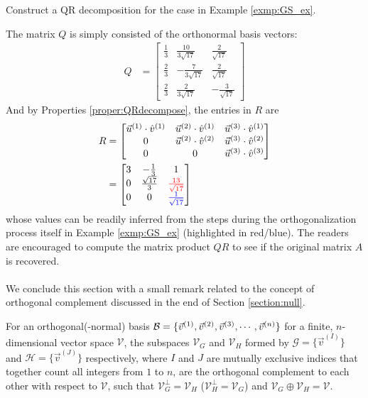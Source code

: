 \begin{exmp}
\label{exmp:QRdecom}
Construct a QR decomposition for the case in Example \ref{exmp:GS_ex}.
\end{exmp}
\begin{solution}
The matrix $Q$ is simply consisted of the orthonormal basis vectors:
\begin{align*}
Q &= 
\begin{bmatrix}
\frac{1}{3} & \frac{10}{3\sqrt{17}} & \frac{2}{\sqrt{17}} \\
\frac{2}{3} & -\frac{7}{3\sqrt{17}} & \frac{2}{\sqrt{17}} \\
\frac{2}{3} & \frac{2}{3\sqrt{17}} & -\frac{3}{\sqrt{17}}
\end{bmatrix}
\end{align*}
And by Properties \ref{proper:QRdecompose}, the entries in $R$ are
\begin{align*}
R &= 
\begin{bmatrix}
\vec{u}^{(1)} \cdot \hat{v}^{(1)} & \vec{u}^{(2)} \cdot \hat{v}^{(1)} & \vec{u}^{(3)} \cdot \hat{v}^{(1)} \\
0 & \vec{u}^{(2)} \cdot \hat{v}^{(2)} & \vec{u}^{(3)} \cdot \hat{v}^{(2)} \\
0 & 0 & \vec{u}^{(3)} \cdot \hat{v}^{(3)}
\end{bmatrix}  \\
&= 
\begin{bmatrix}
3 & -\frac{1}{3} & 1 \\
0 & \frac{\sqrt{17}}{3} & \textcolor{red}{\frac{13}{\sqrt{17}}}  \\
0 & 0 & \textcolor{blue}{\frac{1}{\sqrt{17}}} \\
\end{bmatrix} 
\end{align*}
whose values can be readily inferred from the steps during the orthogonalization process itself in Example \ref{exmp:GS_ex} (highlighted in red/blue). The readers are encouraged to compute the matrix product $QR$ to see if the original matrix $A$ is recovered.\\
\\
We conclude this section with a small remark related to the concept of orthogonal complement discussed in the end of Section \ref{section:null}.
\begin{proper}
\label{proper:orthodirectsum}
For an orthogonal(-normal) basis $\mathcal{B} = \{\vec{v}^{(1)}, \vec{v}^{(2)}, \vec{v}^{(3)}, \cdots, \\ \vec{v}^{(n)}\}$ for a finite, $n$-dimensional vector space $\mathcal{V}$, the subspaces $\mathcal{V}_G$ and $\mathcal{V}_H$ formed by $\mathcal{G} = \{\vec{v}^{(I)}\}$ and $\mathcal{H} = \{\vec{v}^{(J)}\}$ respectively, where $I$ and $J$ are mutually exclusive indices that together count all integers from $1$ to $n$, are the orthogonal complement to each other with respect to $\mathcal{V}$, such that $\mathcal{V}_G^\perp = \mathcal{V}_H$ ($\mathcal{V}_H^\perp = \mathcal{V}_G$) and $\mathcal{V}_G \oplus \mathcal{V}_H = \mathcal{V}$.
\end{proper}
\end{solution}


